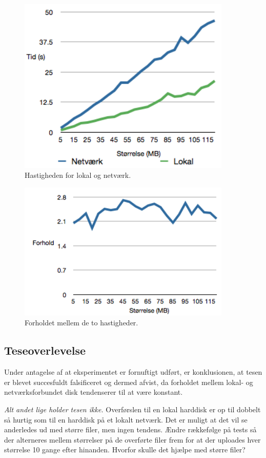 \documentclass{article}
\begin{document}
\begin{figure}
	\includegraphics[width=4in]{ploto.png}
	\caption{Hastigheden for lokal og netværk.}
	\label{ploto}
\end{figure}

\begin{figure}
	\includegraphics[width=4in]{plotforhold.png}
	\caption{Forholdet mellem de to hastigheder.}
	\label{plotforhold}
\end{figure}

\subsection{Teseoverlevelse}
Under antagelse af at eksperimentet er fornuftigt udført, er konklusionen, at tesen er blevet succesfuldt falsificeret og dermed afvist, da forholdet mellem lokal- og netværksforbundet disk tendenserer til at være konstant.

\textit{Alt andet lige holder tesen ikke.}
Overførslen til en lokal harddisk er op til dobbelt så hurtig som til en harddisk på et lokalt netværk.
Det er muligt at det vil se anderledes ud med større filer, men ingen tendens.
Ændre rækkefølge på tests så der alterneres mellem størrelser på de overførte filer frem for at der uploades hver størrelse 10 gange efter hinanden.
Hvorfor skulle det hjælpe med større filer?
\end{document}
